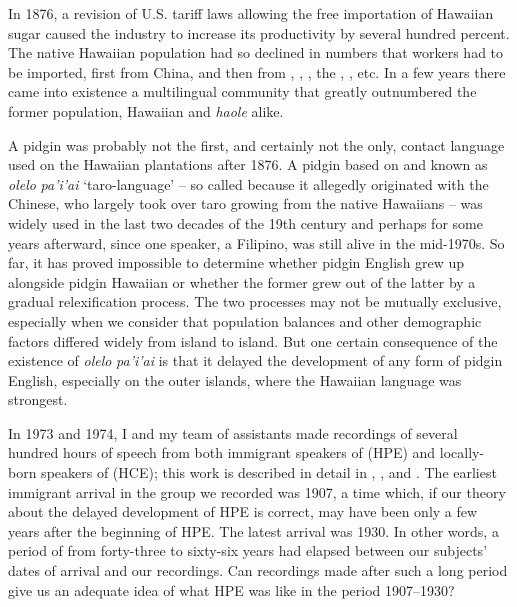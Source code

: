 In 1876, a revision of U.S. tariff laws allowing the free importa\-tion of Hawaiian sugar caused the industry to increase its productivity by several hundred percent. The native Hawaiian population had so declined in numbers that workers had to be imported, first from China, and then from , , , the , , etc. In a few years there came into existence a multilingual community that greatly outnumbered the former population, Hawaiian and \textit{haole} alike.

A pidgin  was probably not the first, and certainly not the only, contact language used on the Hawaiian plantations after 1876. A pidgin based on  and known as \textit{olelo} \textit{pa'i'ai} `taro-language' -- so called because it allegedly originated with the Chinese, who largely took over taro growing from the native Hawaiians -- was widely used in the last two decades of the 19th century \citep[307--308]{Bickerton1977} and perhaps for some years afterward, since one speaker, a Filipino, was still alive in the mid-1970s. So far, it has proved impos\-sible to determine whether pidgin English grew up alongside pidgin Hawaiian or whether the former grew out of the latter by a gradual relexification process. The two processes may not be mutually exclu\-sive, especially when we consider that population balances and other demographic factors differed widely from island to island. But one certain consequence of the existence of \textit{olelo} \textit{pa'i'ai} is that it delayed the development of any form of pidgin English, especially on the outer islands, where the Hawaiian language was strongest.

In 1973 and 1974, I and my team of assistants made recordings
of several hundred hours of speech from both immigrant speakers of  (HPE) and locally-born speakers of  (HCE); this work is described in detail in \citet{BickertonEtAl1976a}, \citet{BickertonEtAl1976b}, and \citet{Bickerton1977}. The earliest immigrant arrival in the group we recorded was 1907, a time which, if our theory about the delayed development of HPE is correct, may have been only a few years after the beginning of HPE. The latest arrival was 1930. In other words, a period of from forty-three to sixty-six years had elapsed between our subjects' dates of arrival and our recordings. Can recordings made after such a long period give us an adequate idea of what HPE was like in the period 1907--1930?


